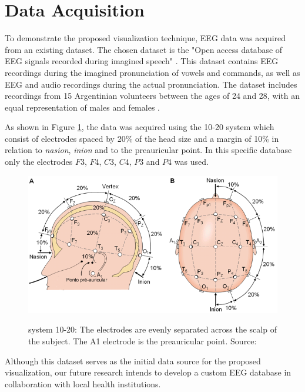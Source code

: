 \documentclass[format=sigconf]{acmart}
\begin{document}
	\section{Data Acquisition}
	
		\par To demonstrate the proposed visualization technique, EEG data was acquired from an existing dataset. The chosen dataset is the "Open access database of EEG signals recorded during imagined speech" \cite{10.1117/12.2255697}. This dataset contains EEG recordings during the imagined pronunciation of vowels and commands, as well as EEG and audio recordings during the actual pronunciation. The dataset includes recordings from 15 Argentinian volunteers between the ages of 24 and 28, with an equal representation of males and females \cite{10.1117/12.2255697}.\newline
	
		\par As shown in Figure \ref{fig:sistema10-20}, the data was acquired using the 10-20 system \cite{sistema10-20} which consist of electrodes spaced by 20\% of the head size and a margin of 10\% in relation to \textit{nasion}, \textit{inion} and to the preauricular point. In this specific database only the electrodes $F3$, $F4$, $C3$, $C4$, $P3$ and $P4$ was used.
		
		\begin{figure}[h]
			\centering
			\caption{system 10-20: The electrodes are evenly separated across the scalp of the subject. The A1 electrode is the preauricular point. Source: \cite{sistema10-20}}
			\includegraphics[width=\linewidth]{../presentation/images/sistema10-20}
			\label{fig:sistema10-20}
		\end{figure}
		
		\par Although this dataset serves as the initial data source for the proposed visualization, our future research intends to develop a custom EEG database in collaboration with local health institutions.
	
\end{document}
